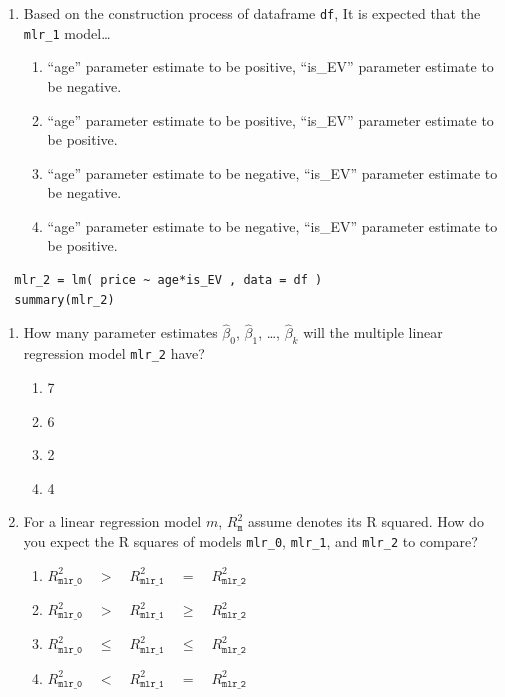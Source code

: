 \documentclass{article}
\begin{document}
\begin{enumerate}[resume]
  \item Based on the construction process of dataframe \texttt{df}, It is expected that the \texttt{mlr\_1} model\dots
  \begin{enumerate}[label=\Alph*)]
    \item ``age'' parameter estimate to be positive, ``is\_EV'' parameter estimate to be negative.
    \item ``age'' parameter estimate to be positive, ``is\_EV'' parameter estimate to be positive.
    \item ``age'' parameter estimate to be negative, ``is\_EV'' parameter estimate to be negative.
    \item ``age'' parameter estimate to be negative, ``is\_EV'' parameter estimate to be positive.
  \end{enumerate}
\end{enumerate}

\newpage
\begin{lstlisting}
  mlr_2 = lm( price ~ age*is_EV , data = df )
  summary(mlr_2)
\end{lstlisting}

\begin{enumerate}[resume]
  \item How many parameter estimates $\hat{\beta}_0$, $\hat{\beta}_1$, \dots, $\hat{\beta}_k$ will the multiple linear regression model \texttt{mlr\_2} have?
  \begin{enumerate}[label=\Alph*)]
    \item 7
    \item 6
    \item 2
    \item 4
  \end{enumerate}
  \item For a linear regression model $m$, $R^2_{\texttt{m}}$ assume denotes its R squared. How do you expect the R squares of models \texttt{mlr\_0}, \texttt{mlr\_1}, and \texttt{mlr\_2} to compare?
  \begin{enumerate}[label=\Alph*)]
    \item $R^2_{\texttt{mlr\_0}} \quad > \quad R^2_{\texttt{mlr\_1}} \quad = \quad R^2_{\texttt{mlr\_2}}$
    \item $R^2_{\texttt{mlr\_0}} \quad > \quad R^2_{\texttt{mlr\_1}} \quad \geq \quad R^2_{\texttt{mlr\_2}}$
    \item $R^2_{\texttt{mlr\_0}} \quad \leq \quad R^2_{\texttt{mlr\_1}} \quad \leq \quad R^2_{\texttt{mlr\_2}}$
    \item $R^2_{\texttt{mlr\_0}} \quad < \quad R^2_{\texttt{mlr\_1}} \quad = \quad R^2_{\texttt{mlr\_2}}$
  \end{enumerate}
\end{enumerate}
\end{document}
